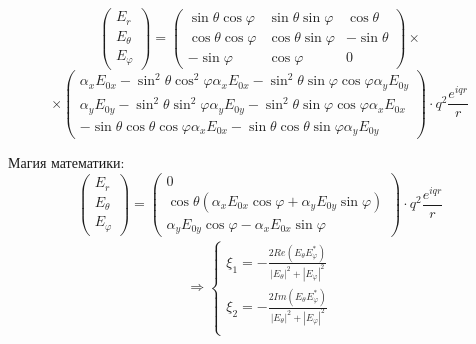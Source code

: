 \documentclass[12pt]{article}
\begin{document}
\begin{large}
\begin{equation*}
\begin{pmatrix}
        E_r \\
        E_\theta \\
        E_\varphi
    \end{pmatrix}
    =
    \begin{pmatrix}
        \sin \theta \cos \varphi & \sin \theta \sin \varphi & \cos \theta\\
        \cos \theta \cos \varphi & \cos \theta \sin \varphi & -\sin \theta\\
        -\sin \varphi & \cos \varphi & 0
    \end{pmatrix} \times
\end{equation*}
\begin{equation*}
    \times
    \begin{pmatrix}
        \alpha_x E_{0x} - \sin^2 \theta \cos^2 \varphi \alpha_x E_{0x} - \sin^2 \theta \sin \varphi \cos \varphi \alpha_y E_{0y} \\
        \alpha_y E_{0y} - \sin^2 \theta \sin^2 \varphi \alpha_y E_{0y} - \sin^2 \theta \sin \varphi \cos \varphi \alpha_x E_{0x} \\
        - \sin \theta \cos \theta \cos \varphi \alpha_x E_{0x} - \sin \theta \cos \theta \sin \varphi \alpha_y E_{0y}
    \end{pmatrix}
    \cdot q^2 \frac{e^{iqr}}{r}
\end{equation*}
\par Магия математики:
\begin{equation*}
    \begin{pmatrix}
        E_r \\
        E_\theta \\
        E_\varphi
    \end{pmatrix}
    =
    \begin{pmatrix}
        0 \\
        \cos \theta \left( \alpha_x E_{0x} \cos \varphi + \alpha_y E_{0y} \sin \varphi \right) \\
        \alpha_y E_{0y} \cos \varphi - \alpha_x E_{0x} \sin \varphi
    \end{pmatrix}
    \cdot q^2 \frac{e^{iqr}}{r}
\end{equation*}
\begin{eqnarray*}
\Rightarrow
    \begin{cases}
        \xi_1 = - \frac{2 Re\left( E_\theta E_\varphi^* \right)}{|E_\theta|^2 + |E_\varphi|^2} \\
        \xi_2 = - \frac{2 Im\left( E_\theta E_\varphi^* \right)}{|E_\theta|^2 + |E_\varphi|^2} \\

\end{cases}
\end{eqnarray*}
\end{large}
\end{document}

